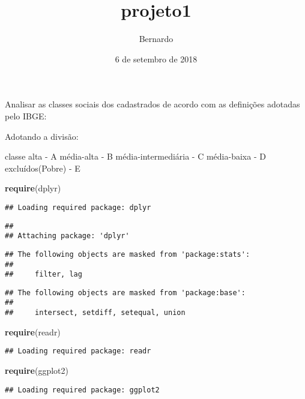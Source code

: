 \documentclass[]{article}
\title{projeto1}
\author{Bernardo}
\date{6 de setembro de 2018}
\newenvironment{Shaded}{\begin{snugshade}}{\end{snugshade}}
\newcommand{\KeywordTok}[1]{\textcolor[rgb]{0.13,0.29,0.53}{\textbf{#1}}}
\newcommand{\NormalTok}[1]{#1}
\begin{document}
\maketitle

Analisar as classes sociais dos cadastrados de acordo com as definições
adotadas pelo IBGE:

Adotando a divisão:

classe alta - A média-alta - B média-intermediária - C média-baixa - D
excluídos(Pobre) - E

\begin{Shaded}
\begin{Highlighting}[]
\KeywordTok{require}\NormalTok{(dplyr)}
\end{Highlighting}
\end{Shaded}

\begin{verbatim}
## Loading required package: dplyr
\end{verbatim}

\begin{verbatim}
## 
## Attaching package: 'dplyr'
\end{verbatim}

\begin{verbatim}
## The following objects are masked from 'package:stats':
## 
##     filter, lag
\end{verbatim}

\begin{verbatim}
## The following objects are masked from 'package:base':
## 
##     intersect, setdiff, setequal, union
\end{verbatim}

\begin{Shaded}
\begin{Highlighting}[]
\KeywordTok{require}\NormalTok{(readr)}
\end{Highlighting}
\end{Shaded}

\begin{verbatim}
## Loading required package: readr
\end{verbatim}

\begin{Shaded}
\begin{Highlighting}[]
\KeywordTok{require}\NormalTok{(ggplot2)}
\end{Highlighting}
\end{Shaded}

\begin{verbatim}
## Loading required package: ggplot2
\end{verbatim}
\end{document}
